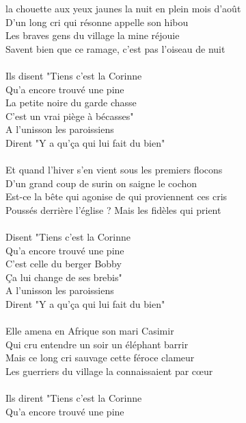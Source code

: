 
 la chouette aux yeux jaunes la nuit en plein mois d'août
\\D'un long cri qui résonne appelle son hibou
\\Les braves gens du village la mine réjouie
\\Savent bien que ce ramage, c'est pas l'oiseau de nuit
\\\\Ils disent "Tiens c'est la Corinne
\\Qu'a encore trouvé une pine
\\La petite noire du garde chasse
\\C'est un vrai piège à bécasses"
\\A l'unisson les paroissiens
\\Dirent "Y a qu'ça qui lui fait du bien"
\\\\Et quand l'hiver s'en vient sous les premiers flocons
\\D'un grand coup de surin on saigne le cochon
\\Est-ce la bête qui agonise de qui proviennent ces cris
\\Poussés derrière l'église ? Mais les fidèles qui prient
\\\\Disent "Tiens c'est la Corinne
\\Qu'a encore trouvé une pine
\\C'est celle du berger Bobby
\\Ça lui change de ses brebis"
\\A l'unisson les paroissiens
\\Dirent "Y a qu'ça qui lui fait du bien"
\\\\Elle amena en Afrique son mari Casimir
\\Qui cru entendre un soir un éléphant barrir
\\Mais ce long cri sauvage cette féroce clameur
\\Les guerriers du village la connaissaient par cœur
\\\\Ils dirent "Tiens c'est la Corinne
\\Qu'a encore trouvé une pine
